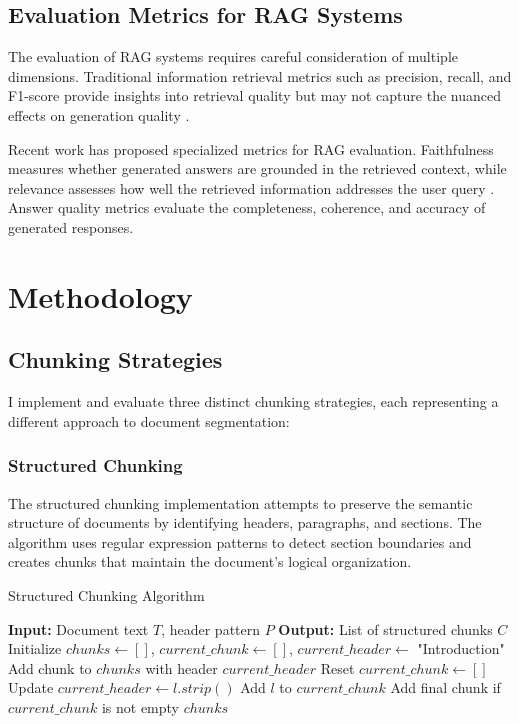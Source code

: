 \documentclass[11pt,a4paper]{article}
\begin{document}
\subsection{Evaluation Metrics for RAG Systems}

The evaluation of RAG systems requires careful consideration of multiple dimensions. Traditional information retrieval metrics such as precision, recall, and F1-score provide insights into retrieval quality but may not capture the nuanced effects on generation quality \citep{rageval2024framework}. 

Recent work has proposed specialized metrics for RAG evaluation. Faithfulness measures whether generated answers are grounded in the retrieved context, while relevance assesses how well the retrieved information addresses the user query \citep{ragas2024framework}. Answer quality metrics evaluate the completeness, coherence, and accuracy of generated responses.

\section{Methodology}

\subsection{Chunking Strategies}

I implement and evaluate three distinct chunking strategies, each representing a different approach to document segmentation:

\subsubsection{Structured Chunking}

The structured chunking implementation attempts to preserve the semantic structure of documents by identifying headers, paragraphs, and sections. The algorithm uses regular expression patterns to detect section boundaries and creates chunks that maintain the document's logical organization.

\begin{algorithm}
\caption{Structured Chunking Algorithm}
\begin{algorithmic}[1]
\STATE \textbf{Input:} Document text $T$, header pattern $P$
\STATE \textbf{Output:} List of structured chunks $C$
\STATE Initialize $chunks \leftarrow []$, $current\_chunk \leftarrow []$, $current\_header \leftarrow$ "Introduction"
            \STATE Add chunk to $chunks$ with header $current\_header$
            \STATE Reset $current\_chunk \leftarrow []$
        \ENDIF
        \STATE Update $current\_header \leftarrow l.strip()$
    \ENDIF
        \STATE Add $l$ to $current\_chunk$
    \ENDIF
\ENDFOR
\STATE Add final chunk if $current\_chunk$ is not empty
\RETURN $chunks$
\end{algorithmic}
\end{algorithm}
\end{document}
